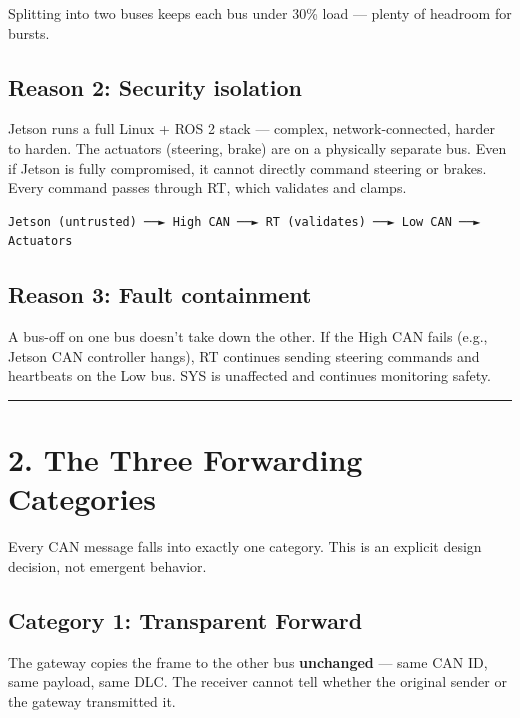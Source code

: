 \documentclass[12pt,a4paper,oneside]{report}
\begin{document}
Splitting into two buses keeps each bus under 30\% load --- plenty of headroom
for bursts.

\subsection{Reason 2: Security isolation}\label{reason-2-security-isolation}

Jetson runs a full Linux + ROS 2 stack --- complex, network-connected, harder to
harden. The actuators (steering, brake) are on a physically separate bus. Even
if Jetson is fully compromised, it cannot directly command steering or brakes.
Every command passes through RT, which validates and clamps.

\begin{verbatim}
Jetson (untrusted) ──► High CAN ──► RT (validates) ──► Low CAN ──► Actuators
\end{verbatim}

\subsection{Reason 3: Fault containment}\label{reason-3-fault-containment}

A bus-off on one bus doesn't take down the other. If the High CAN fails (e.g.,
Jetson CAN controller hangs), RT continues sending steering commands and
heartbeats on the Low bus. SYS is unaffected and continues monitoring safety.

\begin{center}\rule{0.5\linewidth}{0.5pt}\end{center}

\section{2. The Three Forwarding
Categories}\label{the-three-forwarding-categories}

Every CAN message falls into exactly one category. This is an explicit design
decision, not emergent behavior.

\subsection{Category 1: Transparent
Forward}\label{category-1-transparent-forward}

The gateway copies the frame to the other bus \textbf{unchanged} --- same CAN
ID, same payload, same DLC. The receiver cannot tell whether the original sender
or the gateway transmitted it.
\end{document}
